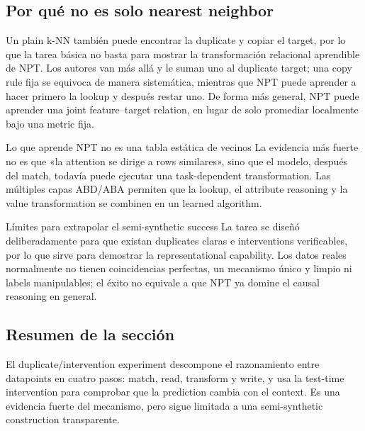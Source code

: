 
\subsection{Por qué no es solo nearest neighbor}

Un plain k-NN también puede encontrar la duplicate y copiar el target, por lo que la tarea básica no basta para mostrar la transformación relacional aprendible de NPT. Los autores van más allá y le suman uno al duplicate target; una copy rule fija se equivoca de manera sistemática, mientras que NPT puede aprender a hacer primero la lookup y después restar uno. De forma más general, NPT puede aprender una joint feature--target relation, en lugar de solo promediar localmente bajo una metric fija.

\begin{importantbox}{Lo que aprende NPT no es una tabla estática de vecinos}
La evidencia más fuerte no es que «la attention se dirige a rows similares», sino que el modelo, después del match, todavía puede ejecutar una task-dependent transformation. Las múltiples capas ABD/ABA permiten que la lookup, el attribute reasoning y la value transformation se combinen en un learned algorithm.
\end{importantbox}


\begin{warningbox}{Límites para extrapolar el semi-synthetic success}
La tarea se diseñó deliberadamente para que existan duplicates claras e interventions verificables, por lo que sirve para demostrar la representational capability. Los datos reales normalmente no tienen coincidencias perfectas, un mecanismo único y limpio ni labels manipulables; el éxito no equivale a que NPT ya domine el causal reasoning en general.
\end{warningbox}

\subsection{Resumen de la sección}

El duplicate/intervention experiment descompone el razonamiento entre datapoints en cuatro pasos: match, read, transform y write, y usa la test-time intervention para comprobar que la prediction cambia con el context. Es una evidencia fuerte del mecanismo, pero sigue limitada a una semi-synthetic construction transparente.
